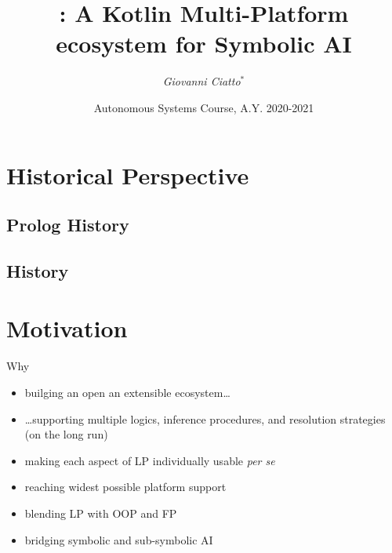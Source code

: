 \documentclass[presentation]{beamer}
\title[\twopkt]{
    \twopkt{}: A Kotlin Multi-Platform ecosystem for Symbolic AI 
}
\author[Ciatto G.]{
	\emph{Giovanni Ciatto}$^{*}$ %
}
\institute[UniBo]{
    $^{*}$Dipartimento di Informatica -- Scienza e Ingegneria (DISI)
    \\
    \textsc{Alma Mater Studiorum} -- Università di Bologna
    \\
    \texttt{
        giovanni.ciatto@unibo.it %
    }
}
\date[A.Y. 20-21]{
	Autonomous Systems Course, A.Y. 2020-2021
}
\begin{document}

\frame{\titlepage}

\section{Historical Perspective}

\subsection{Prolog History}

\subsection{\tuprolog{} History}

\section{Motivation}

\begin{frame}{Why \twopkt{}}
    \begin{itemize}
        \item builging an open an extensible ecosystem\ldots
        \item \ldots supporting multiple logics, inference procedures, and resolution strategies (on the long run)
        \item making each aspect of LP individually usable \emph{per se}
        \item reaching widest possible platform support 
        \item blending LP with OOP and FP
        \item bridging symbolic and sub-symbolic AI
    \end{itemize}
\end{frame}
\end{document}

